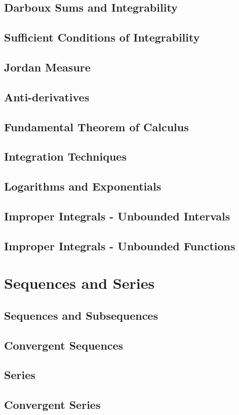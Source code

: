 \documentclass{book}
\begin{document}
\section{Darboux Sums and Integrability}
\section{Sufficient Conditions of Integrability}
\section{Jordan Measure}
\section{Anti-derivatives}
\section{Fundamental Theorem of Calculus}
\section{Integration Techniques}
\section{Logarithms and Exponentials}
\section{Improper Integrals - Unbounded Intervals}
\section{Improper Integrals - Unbounded Functions}

\chapter{Sequences and Series}
\section{Sequences and Subsequences}
\section{Convergent Sequences}
\section{Series}
\section{Convergent Series}
\end{document}
